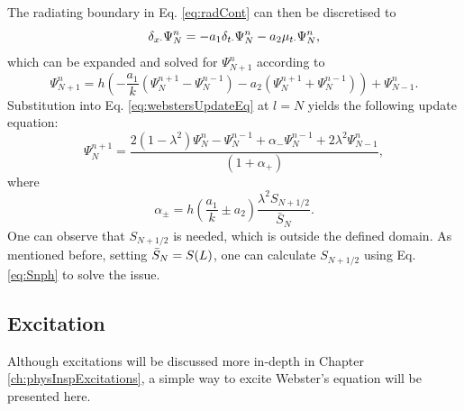 The radiating boundary in Eq. \eqref{eq:radCont} can then be discretised to \cite{theBible}
\begin{equation}\label{eq:centRadBound}
    \delta_{x\cdot}\Psi_N^n = -a_1\delta_{t\cdot}\Psi_N^n - a_2\mu_{t\cdot}\Psi_N^n,
\end{equation}
which can be expanded and solved for $\Psi_{N+1}^n$ according to
\begin{equation}
    \Psi_{N+1}^n = h\left(-\frac{a_1}{k}(\Psi_N^{n+1} - \Psi_N^{n-1}) - a_2(\Psi_N^{n+1} + \Psi_N^{n-1})\right) + \Psi_{N-1}^n.
\end{equation}
Substitution into Eq. \eqref{eq:webstersUpdateEq} at $l=N$ yields the following update equation:
\begin{equation}
    \Psi_N^{n+1} = \frac{2(1-\lambda^2)\Psi_N^n-\Psi_N^{n-1}+\alpha_-\Psi_N^{n-1} + 2\lambda^2\Psi_{N-1}^n}{\left(1+\alpha_+\right)},
\end{equation}
where
\begin{equation}
    \alpha_\pm = h\left(\frac{a_1}{k}\pm a_2\right)\frac{\lambda^2S_{N+1/2}}{\bar S_N}.
\end{equation}
One can observe that $S_{N+1/2}$ is needed, which is outside the defined domain. As mentioned before, setting $\bar{S}_N = S(L)$, one can calculate $S_{N+1/2}$ using Eq. \eqref{eq:Snph} to solve the issue. 

\subsection{Excitation}\label{sec:webstersExcitation}
Although excitations will be discussed more in-depth in Chapter \ref{ch:physInspExcitations}, a simple way to excite Webster's equation will be presented here.

